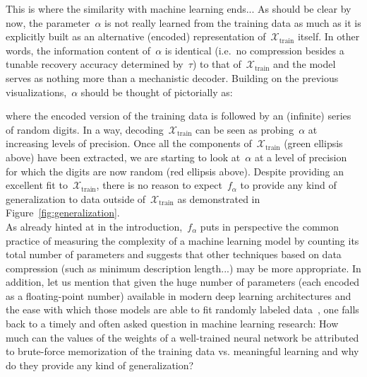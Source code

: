 \documentclass{article}
\begin{document}
\noindent This is where the similarity with machine learning ends...  As should be clear by now, the parameter~$\alpha$ is not really learned from the training data as much as it is explicitly built as an alternative (encoded) representation of~$\mathcal{X}_\text{train}$ itself.  In  other words, the information content of~$\alpha$ is identical (i.e.~no compression besides a tunable recovery accuracy determined by~$\tau$) to that of~$\mathcal{X}_\text{train}$ and the model serves as nothing more than a mechanistic decoder.  Building on the previous visualizations,~$\alpha$ should be thought of pictorially as:
\begin{center}
\end{center}
\noindent where the encoded version of the training data is followed by an (infinite) series of random digits.  In a way, decoding~$\mathcal{X}_\text{train}$ can be seen as probing~$\alpha$ at increasing levels of precision.  Once all the components of~$\mathcal{X}_\text{train}$ (green ellipsis above) have been extracted, we are starting to look at~$\alpha$ at a level of precision for which the digits are now random (red ellipsis above).  Despite providing an excellent fit to~$\mathcal{X}_\text{train}$, there is no reason to expect~$f_\alpha$ to provide any kind of generalization to data outside of~$\mathcal{X}_\text{train}$ as demonstrated in Figure~\ref{fig:generalization}. \\

\noindent  As already hinted at in the introduction,~$f_\alpha$ puts in perspective the common practice of measuring the complexity of a machine learning model by counting its total number of parameters and suggests that other techniques based on data compression (such as minimum description length...) may be more appropriate.  In addition, let us mention that given the huge number of parameters (each encoded as a floating-point number) available in modern deep learning architectures and the ease with which those models are able to fit randomly labeled data~\cite{intriguing,shamtikov}, one falls back to a timely and often asked question in machine learning research: How much can the values of the weights of a well-trained neural network be attributed to brute-force memorization of the training data vs. meaningful learning and why do they provide any kind of generalization?
\end{document}

